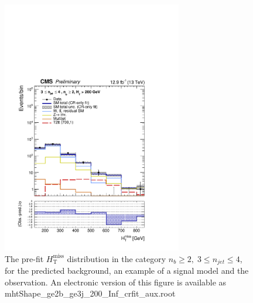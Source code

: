 \clearpage
\begin{figure}[tbhp]
    \caption{ 
    The pre-fit $H_{\mathrm{T}}^{\mathrm{miss}}$ distribution in the category $n_{b}\geq 2, \; 3 \leq n_{jet} \leq 4$, 
    for the predicted background, an example of a signal model and the observation.
    An electronic version of this figure is available as mhtShape\_ge2b\_ge3j\_200\_Inf\_crfit\_aux.root
    \label{fig:mhtShape_ge2b_ge3j_crfit} }
  \begin{center}
  \includegraphics[width=0.7\textwidth]{mhtShape_ge2b_ge3j_200_Inf_crfit_aux}
  \end{center}
\end{figure}


